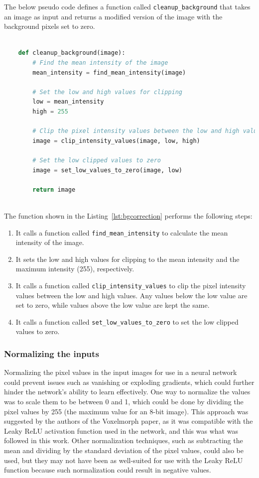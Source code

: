 \documentclass{report}
\begin{document}
	The below pseudo code defines a function called \texttt{cleanup\_background} that takes an image as input and returns a modified version of the image with the background pixels set to zero.
	
	\begin{lstlisting}[language=python, label=lst:bgcorrection, caption=Pseudo function to show the background noise removal in an image.]

	def cleanup_background(image):
		# Find the mean intensity of the image
		mean_intensity = find_mean_intensity(image)
	
		# Set the low and high values for clipping
		low = mean_intensity
		high = 255
	
		# Clip the pixel intensity values between the low and high values
		image = clip_intensity_values(image, low, high)
	
		# Set the low clipped values to zero
		image = set_low_values_to_zero(image, low)
	
		return image
	
	\end{lstlisting}	
	
	The function shown in the Listing~\ref{lst:bgcorrection} performs the following steps:
	
	\begin{enumerate}
		\item It calls a function called \texttt{find\_mean\_intensity} to calculate the mean intensity of the image.
		\item It sets the low and high values for clipping to the mean intensity and the maximum intensity (255), respectively.
		\item It calls a function called \texttt{clip\_intensity\_values} to clip the pixel intensity values between the low and high values. Any values below the low value are set to zero, while values above the low value are kept the same.
		\item It calls a function called \texttt{set\_low\_values\_to\_zero} to set the low clipped values to zero.
	\end{enumerate}
	
	\subsubsection{Normalizing the inputs}
	Normalizing the pixel values in the input images for use in a neural network could prevent issues such as vanishing or exploding gradients, which could further hinder the network's ability to learn effectively. One way to normalize the values was to scale them to be between 0 and 1, which could be done by dividing the pixel values by 255 (the maximum value for an 8-bit image). This approach was suggested by the authors of the Voxelmorph paper, as it was compatible with the Leaky ReLU activation function used in the network, and this was what was followed in this work. Other normalization techniques, such as subtracting the mean and dividing by the standard deviation of the pixel values, could also be used, but they may not have been as well-suited for use with the Leaky ReLU function because such normalization could result in negative values.
	
\end{document}
